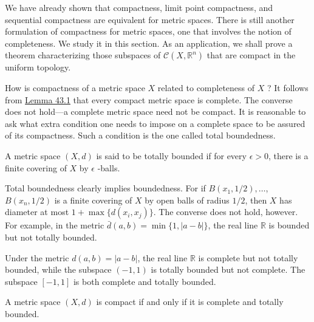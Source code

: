 We have already shown that compactness, limit point compactness, and sequential compactness are equivalent for metric spaces. There is still another formulation of compactness for metric spaces, one that involves the notion of completeness. We study it in this section. As an application, we shall prove a theorem characterizing those subspaces of \(\mathcal{C}({X,\mathbb{R}^{n}})\) that are compact in the uniform topology.

How is compactness of a metric space \(X\) related to completeness of \(X\) ? It follows from \hyperref[lem:43.1]{Lemma 43.1} that every compact metric space is complete. The converse does not hold---a complete metric space need not be compact. It is reasonable to ask what extra condition one needs to impose on a complete space to be assured of its compactness. Such a condition is the one called total boundedness.

\begin{definition}
A metric space \((X, d)\) is said to be totally bounded if for every \(\epsilon > 0\), there is a finite covering of \(X\) by \(\epsilon\) -balls.
\end{definition}

\begin{centeredblock}
\begin{example}
\label{ex:\thesection.\theexample}
Total boundedness clearly implies boundedness. For if \(B({x_{1},1/2}),\ldots\), \(B({x_{n},1/2})\) is a finite covering of \(X\) by open balls of radius \(1/2\), then \(X\) has diameter at most \(1 + \max \{ {d({x_{i},x_{j}}) }\}\). The converse does not hold, however. For example, in the metric \(\bar{d}({a,b}) = \min \{ 1,| {a - b}| \}\), the real line \(\mathbb{R}\) is bounded but not totally bounded.
\end{example}
\end{centeredblock}

\begin{centeredblock}
\begin{example}
\label{ex:\thesection.\theexample}
Under the metric \(d({a,b}) = | {a - b}|\), the real line \(\mathbb{R}\) is complete but not totally bounded, while the subspace \((-1,1)\) is totally bounded but not complete. The subspace \([ {-1,1}]\) is both complete and totally bounded.
\end{example}
\end{centeredblock}

\begin{theorem}
\label{thm:\thetheorem}
A metric space \((X, d)\) is compact if and only if it is complete and totally bounded.
\end{theorem}

